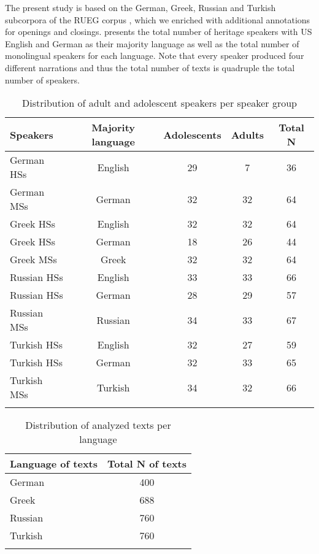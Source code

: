 \documentclass[output=paper,colorlinks,citecolor=brown]{langscibook}
\begin{document}
 The present study is based on the German, Greek, Russian and Turkish subcorpora of the RUEG corpus \parencite{RUEGcorpus2024}, which we enriched with additional annotations for openings and closings. %
  presents the total number of heritage speakers with US English and German as their majority language as well as the total number of monolingual speakers for each language. Note that every speaker produced four different narrations and thus the total number of texts is quadruple the total number of speakers.

\begin{table}
\caption{Distribution of adult and adolescent speakers per speaker group}
\label{tab:katsikaetal:participants}
 \begin{tabularx}{.9\textwidth}{lcccc}
   \lsptoprule
    Speakers & Majority language & Adolescents & Adults & Total N\\
    
 \midrule
  German HSs & English  &   29 & 7 & 36\\
  German MSs & German  &  32 & 32 & 64\\
  Greek HSs & English  &  32 & 32 & 64\\
  Greek HSs & German  &  18 & 26 & 44\\
  Greek MSs &  Greek  &  32 & 32 & 64\\
  Russian HSs & English  &  33 & 33 & 66\\
  Russian HSs & German  &  28 & 29 & 57\\
  Russian MSs &  Russian  & 34 & 33 & 67\\
  Turkish HSs & English  & 32 & 27 & 59\\
  Turkish HSs & German  &  32 & 33 & 65\\
  Turkish MSs &  Turkish  & 34 & 32 & 66\\
  \lspbottomrule
  \end{tabularx}
  \end{table}
 

\begin{table}
\caption{Distribution of analyzed texts per language}
\label{tab:katsikaetal:texts}
 \begin{tabularx}{.5\textwidth}{lc}
   \lsptoprule
    Language of texts & Total N of texts\\
    
 \midrule
  German & 400\\
  Greek  & 688\\
  Russian & 760\\
  Turkish  & 760\\
  \lspbottomrule
  \end{tabularx}
  \end{table}
\end{document}
